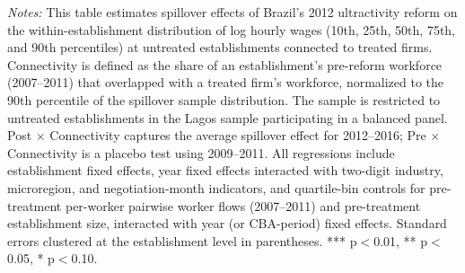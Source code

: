 \documentclass[12pt,letterpaper]{article}
\begin{document}
\begin{table}[]
\begin{threeparttable}
\begin{tablenotes}
\item \textit{Notes:} This table estimates spillover effects of Brazil's 2012 ultractivity reform on the within-establishment distribution of log hourly wages (10th, 25th, 50th, 75th, and 90th percentiles) at untreated establishments connected to treated firms. Connectivity is defined as the share of an establishment's pre-reform workforce (2007--2011) that overlapped with a treated firm's workforce, normalized to the 90th percentile of the spillover sample distribution. The sample is restricted to untreated establishments in the Lagos sample participating in a balanced panel. Post $\times$ Connectivity captures the average spillover effect for 2012--2016; Pre $\times$ Connectivity is a placebo test using 2009--2011. All regressions include establishment fixed effects, year fixed effects interacted with two-digit industry, microregion, and negotiation-month indicators, and quartile-bin controls for pre-treatment per-worker pairwise worker flows (2007--2011) and pre-treatment establishment size, interacted with year (or CBA-period) fixed effects. Standard errors clustered at the establishment level in parentheses. *** p$<$0.01, ** p$<$0.05, * p$<$0.10.
\end{tablenotes}
\end{threeparttable}
\end{table}

\clearpage
\end{document}
